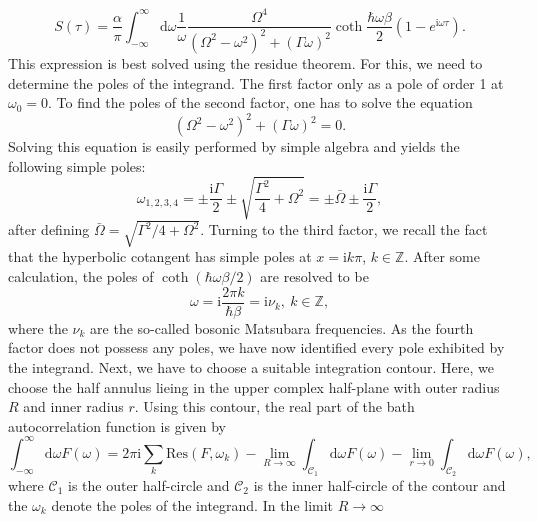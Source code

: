 %
\begin{equation}
    S \left( \tau \right) = \frac{\alpha}{\pi} 
    \int_{-\infty}^{\infty} \text{d}\omega \frac{1}{\omega} \frac{\Omega^4}{\left(\Omega^2-\omega^2\right)^2
    + \left(\Gamma\omega\right)^2}
    \coth\frac{\hbar\omega\beta}{2} \left( 1-e^{\text{i}\omega\tau} \right).
\end{equation}
%
This expression is best solved using the residue theorem. For this, we need to determine
the poles of the integrand. The first factor only as a pole of order 1 at $\omega_0 = 0$.
To find the poles of the second factor, one has to solve the equation
%
\begin{equation}
    \left(\Omega^2-\omega^2\right)^2
    + \left(\Gamma\omega\right)^2 = 0 .
\end{equation}
%
Solving this equation is easily performed by simple algebra and yields the following simple poles:
%
\begin{equation}
    \omega_{1,2,3,4} = \pm \frac{\text{i} \Gamma}{2} \pm \sqrt{\frac{\Gamma^2}{4} + \Omega^2}
    = \pm \bar{\Omega} \pm \frac{\text{i} \Gamma}{2},
\end{equation}
%
after defining $\bar{\Omega} = \sqrt{\Gamma^2/4 + \Omega^2}$.
Turning to the third factor, we recall the fact that the hyperbolic cotangent has simple poles
at $x = \text{i} k \pi$, $k \in \mathbb{Z}$. After some calculation, the poles of $\coth\left(\hbar\omega\beta / 2\right)$
are resolved to be
%
\begin{equation}
    \omega = \text{i} \frac{2\pi k}{\hbar\beta} = \text{i} \nu_k, \ k \in \mathbb{Z},
\end{equation}
%
where the $\nu_k$ are the so-called bosonic Matsubara frequencies. As the fourth factor 
does not possess any poles, we have now identified every pole exhibited by the integrand.
Next, we have to choose a suitable integration contour. Here, we choose the half annulus lieing
in the upper complex half-plane with outer radius $R$ and inner radius $r$.
Using this contour, the real part of the bath autocorrelation function is given by
%
\begin{equation}
    \int_{-\infty}^{\infty} \text{d}\omega F(\omega) = 2\pi\text{i}\sum_{k} \text{Res}(F,\omega_k)
    -\lim_{R\rightarrow\infty} \int_{\mathcal{C}_1}\text{d}\omega F(\omega)
    -\lim_{r\rightarrow 0} \int_{\mathcal{C}_2}\text{d}\omega F(\omega),
\end{equation}
%
where $\mathcal{C}_1$ is the outer half-circle and $\mathcal{C}_2$ is the inner half-circle
of the contour and the $\omega_k$ denote the poles of the integrand. In the limit $R\rightarrow\infty$
